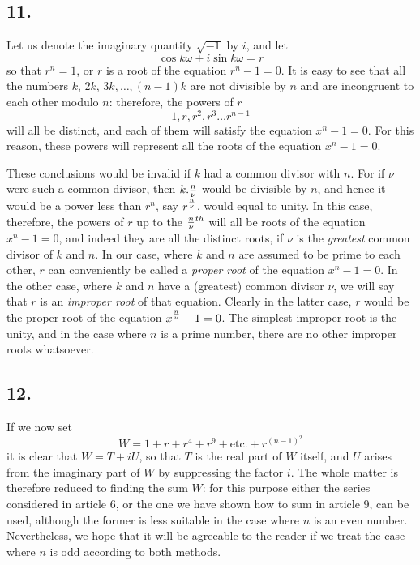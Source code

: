 \documentclass[twoside,12pt]{memoir}
\let\oldfrac\frac
\def\frac#1#2{\mathchoice{\tfrac{#1}{#2}}{\oldfrac{#1}{#2}}{\genfrac{}{}{}{2}{#1}{#2\mathstrut}}{\genfrac{}{}{}{3}{#1}{#2\mathstrut}}}
\begin{document}
\subsection*{11.}
Let us denote the imaginary quantity \(\sqrt{-1}\) by \(i\), and let
\[\cos k \omega+i \sin k \omega=r\]
so that \(r^{n}=1\), or \(r\) is a root of the equation \(r^{n}-1=0\). It is easy to see that all the numbers \(k\), \(2 k\), \(3 k, \ldots, (n-1) k\) are not divisible by \(n\) and are incongruent to each other modulo \(n\): therefore, the powers of \(r\)
\[1, r, r^{2}, r^{3} \ldots r^{n-1}\]
will all be distinct, and each of them will satisfy the equation \(x^{n}-1=0\). For this reason, these powers will represent all the roots of the equation \(x^{n}-1=0\).

These conclusions would be invalid if \(k\) had a common divisor with \(n\). For if \(\nu\) were such a common divisor, then \(k . \frac{n}{\nu}\) would be divisible by \(n\), and hence it would be a power less than \(r^{n}\), say \(r^{\frac{n}{\nu}}\), would equal to unity. In this case, therefore, the powers of \(r\) up to the \(\frac{n}{\nu}^{th}\) will all be roots of the equation \(x^{n}-1=0\), and indeed they are all the distinct roots, if \(\nu\) is the \textit{greatest} common divisor \pagebreak%
of \(k\) and \(n\). In our case, where \(k\) and \(n\) are assumed to be prime to each other, \(r\) can conveniently be called a \textit{proper root} of the equation \(x^{n}-1=0\).  In the other case, where \(k\) and \(n\) have a (greatest) common divisor \(\nu\), we will say that \(r\) is an \textit{improper root} of that equation.  Clearly in the latter case, \(r\) would be the proper root of the equation \(x^{\frac{n}{\nu}}-1=0\). The simplest improper root is the unity, and in the case where \(n\) is a prime number, there are no other improper roots whatsoever.

\subsection*{12.}

If we now set
\[W=1+r+r^{4}+r^{9}+\text{etc{.}}+r^{(n-1)^{2}}\]
it is clear that \(W=T+i U\), so that \(T\) is the real part of \(W\) itself, and \(U\) arises from the imaginary part of \(W\) by suppressing the factor \(i\). The whole matter is therefore reduced to finding the sum \(W\): for this purpose either the series considered in article 6, or the one we have shown how to sum in article 9, can be used, although the former is less suitable in the case where \(n\) is an even number. Nevertheless, we hope that it will be agreeable to the reader if we treat the case where \(n\) is odd according to both methods.
\end{document}
